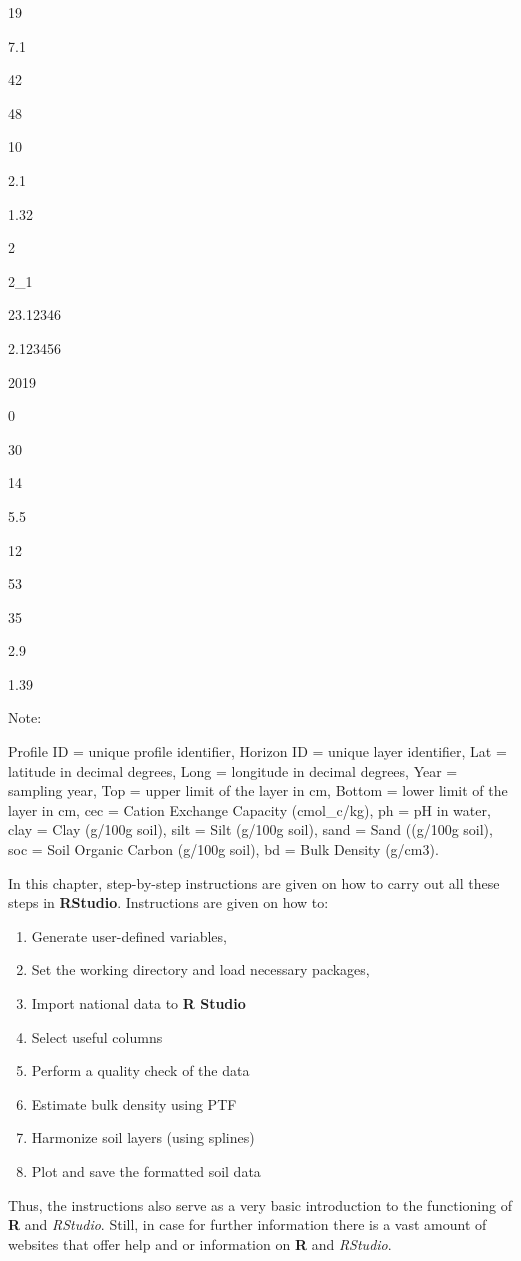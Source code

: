 \documentclass[
  10pt,
  b5paper,
  oneside]{book}
\providecommand{\tightlist}{%
  \setlength{\itemsep}{0pt}\setlength{\parskip}{0pt}}
\begin{document}
19

7.1

42

48

10

2.1

1.32

2

2\_1

23.12346

2.123456

2019

0

30

14

5.5

12

53

35

2.9

1.39

{Note: }

Profile ID = unique profile identifier, Horizon ID = unique layer identifier, Lat = latitude in decimal degrees, Long = longitude in decimal degrees, Year = sampling year, Top = upper limit of the layer in cm, Bottom = lower limit of the layer in cm, cec = Cation Exchange Capacity (cmol\_c/kg), ph = pH in water, clay = Clay (g/100g soil), silt = Silt (g/100g soil), sand = Sand ((g/100g soil), soc = Soil Organic Carbon (g/100g soil), bd = Bulk Density (g/cm3).

In this chapter, step-by-step instructions are given on how to carry out all these steps in \textbf{RStudio}. Instructions are given on how to:

\begin{enumerate}
\def\labelenumi{\arabic{enumi}.}
\tightlist
\item
  Generate user-defined variables,
\item
  Set the working directory and load necessary packages,
\item
  Import national data to \textbf{R Studio}
\item
  Select useful columns
\item
  Perform a quality check of the data
\item
  Estimate bulk density using PTF
\item
  Harmonize soil layers (using splines)
\item
  Plot and save the formatted soil data
\end{enumerate}

Thus, the instructions also serve as a very basic introduction to the functioning of \textbf{R} and \emph{RStudio}. Still, in case for further information there is a vast amount of websites that offer help and or information on \textbf{R} and \emph{RStudio}.
\end{document}

